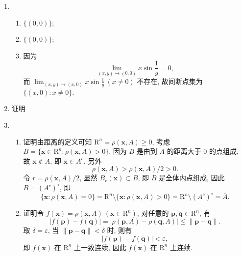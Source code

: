 \documentclass[a4paper, 11pt]{ctexart}
\begin{document}
\begin{enumerate}
    \item %
        \begin{enumerate}[(1)]
            \item %
                $\{(0,0)\}$;
            \item %
                $\{(0,0)\}$;
            \item %
                因为
                \[
                    \lim_{(x,y)\to(0,0)}x\sin\frac1y = 0,    
                \]
                而 $\lim_{(x,y)\to(x,0)}x\sin\frac1y\ (x \neq 0)$ 不存在, 故间断点集为 $\{(x,0) : x \neq 0\}$.
        \end{enumerate}
    \item %
        {\heiti 证明} 
    \item %
        \begin{enumerate}[(1)]
            \item %
                {\heiti 证明}\quad 由距离的定义可知 $\mathrm{R}^n = \rho(\boldsymbol{x}, A) \geqslant 0$, 考虑 $B = \{\boldsymbol{x} \in \mathrm{R}^n : \rho(\boldsymbol{x}, A) > 0\}$,
                因为 $B$ 是由到 $A$ 的距离大于 $0$ 的点组成, 故 $\boldsymbol{x} \notin A$, 即 $\boldsymbol{x} \in A^c$. 另外
                \[
                    \rho(\boldsymbol{x}, A) > \rho(\boldsymbol{x}, A) / 2 > 0.    
                \]
                令 $r = \rho(\boldsymbol{x}, A) / 2$, 显然 $B_r(\boldsymbol{x}) \subset B$, 即 $B$ 是全体内点组成, 因此 $B = (A^c)^\circ$, 即
                \[
                    \{\boldsymbol{x} : \rho(\boldsymbol{x}, A) = 0\} = \mathrm{R}^n \setminus \{\boldsymbol{x} : \rho(\boldsymbol{x}, A) > 0\} = \mathrm{R}^n \setminus (A^c)^\circ = \overline{A}.     
                \]
            \item %
                {\heiti 证明}\quad 令 $f(\boldsymbol{x}) = \rho(\boldsymbol{x}, A)\ (\boldsymbol{x} \in \mathrm{R}^n)$, 对任意的 $\boldsymbol{p}, \boldsymbol{q} \in \mathrm{R}^n$, 有
                \[
                    |f(\boldsymbol{p}) - f(\boldsymbol{q})| = |\rho(\boldsymbol{p}, A) - \rho(\boldsymbol{q}, A)| \leqslant \|\boldsymbol{p} - \boldsymbol{q}\|.    
                \]
                取 $\delta = \varepsilon$, 当 $\|\boldsymbol{p} - \boldsymbol{q}\| < \delta$ 时, 则有
                \[
                    |f(\boldsymbol{p}) - f(\boldsymbol{q})| < \varepsilon,    
                \]
                即 $f(\boldsymbol{x})$ 在 $\mathrm{R}^n$ 上一致连续, 因此 $f(\boldsymbol{x})$ 在 $\mathrm{R}^n$ 上连续.
        \end{enumerate}

\end{enumerate}
\end{document}
